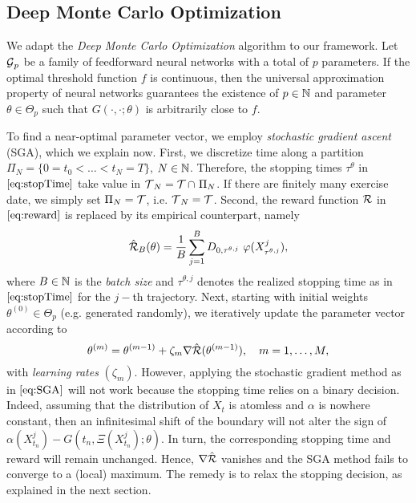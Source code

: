 \subsection{Deep Monte Carlo Optimization} \label{sec:DMCO}
We adapt the \textit{Deep Monte Carlo Optimization} algorithm \cite{HanJentzenE} to our framework. Let $\operatorname{\mathcal{G}}_p$ be a family of feedforward neural networks  with a total of $p$ parameters. If the optimal threshold function $f$ is continuous, then the universal approximation property of neural networks  \cite{Cybenko,Hornik} guarantees the existence of $p\in \operatorname{\mathbb{N}}$ and parameter $\theta \in \Theta_p$ such that $G(\cdot,\cdot;\theta)$ is arbitrarily close to $f$.  

To find a near-optimal parameter vector, we employ  \textit{stochastic gradient ascent} (SGA), which we explain now. First, we discretize time along a partition $\Pi_N = \{0 = t_0 < \ldots < t_N=T\}$, $N\in \operatorname{\mathbb{N}}$. Therefore, the stopping times $\tau^{\theta}$ in $\eqref{eq:stopTime}$ take value in   $\operatorname{\mathcal{T}}_N = \operatorname{\mathcal{T}} \cap \ \Pi_N$. %
If there are finitely many exercise date, we simply set $\Pi_N = \operatorname{\mathcal{T}}$, i.e. $\operatorname{\mathcal{T}}_N = \operatorname{\mathcal{T}}$. 
Second, the reward function $\operatorname{\mathcal{R}}$ in $\eqref{eq:reward}$ is replaced by its empirical counterpart, namely
\begin{equation}\label{eq:empReward1}
    \hat{\calR}_B(\theta) = \frac{1}{B}\sum_{j=1}^B   D_{0,\tau^{\theta,j}}  \ \varphi(X_{\tau^{\theta,j}}^j),
\end{equation}
where $B\in \operatorname{\mathbb{N}}$ is the \textit{batch size} and  $\tau^{\theta,j}$ denotes the realized  stopping time as in $\eqref{eq:stopTime}$ for the $j-$th trajectory. Next, 
starting with initial weights  $\theta^{(0)}\in \Theta_p$ (e.g. generated randomly), we iteratively update the parameter vector  according to 
\begin{equation}\label{eq:SGA}
\theta^{(m)} = \theta^{(m-1)} + \zeta_m \nabla \hat{\operatorname{\mathcal{R}}}(\theta^{(m-1)}), \quad m=1,\ldots, M,  
\end{equation}
with \textit{learning rates} $(\zeta_m)$. 
However, applying the stochastic gradient method as in $\eqref{eq:SGA}$ will not work because the stopping time relies on a binary decision.  Indeed, assuming that the distribution of $X_t$ is atomless and $\alpha$ is nowhere constant, then an infinitesimal shift of the boundary will not alter the sign of  $\alpha(X^{j}_{t_n}) - G(t_n,\Xi(X^{j}_{t_n}); \theta)$. In turn, the corresponding stopping time and  reward will remain unchanged. 
Hence, $\nabla \hat{\operatorname{\mathcal{R}}}$ vanishes and the SGA method fails to  converge to a (local) maximum. 
The remedy is to relax the stopping decision, as  explained in the next section. 
